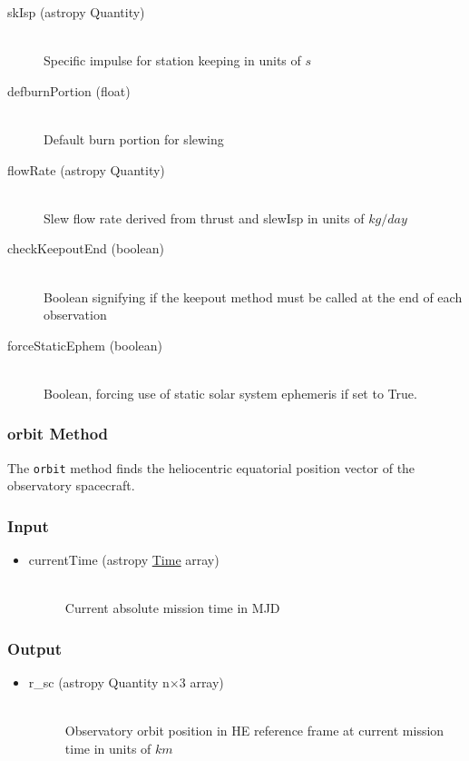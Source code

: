 \documentclass[cleanfoot]{asme2ej}
\begin{document}
\begin{itemize}
\begin{description}
    \item[skIsp (astropy Quantity)] \hfill \\ Specific impulse for station keeping in units of $ s $
    \item[defburnPortion (float)] \hfill \\ Default burn portion for slewing
    \item[flowRate (astropy Quantity)] \hfill \\ Slew flow rate derived from thrust and slewIsp in units of $ kg/day $
    \item[checkKeepoutEnd (boolean)] \hfill \\ Boolean signifying if the keepout method must be called at the end of each observation
    \item[forceStaticEphem (boolean)] \hfill \\ Boolean, forcing use of static solar system ephemeris if set to True.
\end{description}
\end{itemize}

\subsubsection{orbit Method} \label{sec:orbittask}
The \verb+orbit+ method finds the heliocentric equatorial position vector of the observatory spacecraft.

\subsubsection*{Input}
\begin{itemize}
\item
\begin{description}
    \item[currentTime (astropy \href{http://astropy.readthedocs.org/en/latest/time/index.html}{Time} array)] \hfill \\ Current absolute mission time in MJD
\end{description}
\end{itemize}

\subsubsection*{Output}
\begin{itemize}
\item
\begin{description}
    \item[r\_sc (astropy Quantity n$\times$3 array)] \hfill \\ Observatory orbit position in HE reference frame at current mission time in units of $ km $
\end{description}
\end{itemize}
\end{document}
